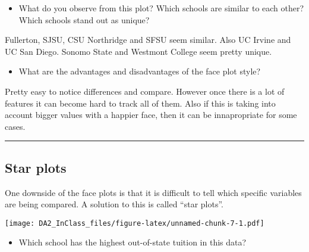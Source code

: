 \documentclass[]{article}
\newenvironment{Shaded}{\begin{snugshade}}{\end{snugshade}}
\newcommand{\DataTypeTok}[1]{\textcolor[rgb]{0.13,0.29,0.53}{#1}}
\newcommand{\DecValTok}[1]{\textcolor[rgb]{0.00,0.00,0.81}{#1}}
\newcommand{\FloatTok}[1]{\textcolor[rgb]{0.00,0.00,0.81}{#1}}
\newcommand{\KeywordTok}[1]{\textcolor[rgb]{0.13,0.29,0.53}{\textbf{#1}}}
\newcommand{\NormalTok}[1]{#1}
\newcommand{\OperatorTok}[1]{\textcolor[rgb]{0.81,0.36,0.00}{\textbf{#1}}}
\newcommand{\StringTok}[1]{\textcolor[rgb]{0.31,0.60,0.02}{#1}}
\providecommand{\tightlist}{%
  \setlength{\itemsep}{0pt}\setlength{\parskip}{0pt}}
\begin{document}
\begin{itemize}
\tightlist
\item
  What do you observe from this plot? Which schools are similar to each
  other? Which schools stand out as unique?
\end{itemize}

Fullerton, SJSU, CSU Northridge and SFSU seem similar. Also UC Irvine
and UC San Diego. Sonomo State and Westmont College seem pretty unique.

\begin{itemize}
\tightlist
\item
  What are the advantages and disadvantages of the face plot style?
\end{itemize}

Pretty easy to notice differences and compare. However once there is a
lot of features it can become hard to track all of them. Also if this is
taking into account bigger values with a happier face, then it can be
innapropriate for some cases.

\begin{center}\rule{0.5\linewidth}{\linethickness}\end{center}

\hypertarget{star-plots}{%
\subsection{Star plots}\label{star-plots}}

One downside of the face plots is that it is difficult to tell which
specific variables are being compared. A solution to this is called
``star plots''.

\begin{Shaded}
\end{Shaded}

\texttt{[image: DA2\_InClass\_files/figure-latex/unnamed-chunk-7-1.pdf]}

\begin{itemize}
\tightlist
\item
  Which school has the highest out-of-state tuition in this data?
\end{itemize}
\end{document}
